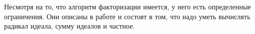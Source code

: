 \documentclass[_00_dissertation.tex]{subfiles}
\begin{document}
Несмотря на то, что алгоритм факторизации имеется, у него есть определенные ограничения.
Они описаны в работе \cite{Darkey-Mensah} и состоят в том, что надо уметь вычислять радикал идеала, сумму идеалов и частное.









\end{document}
